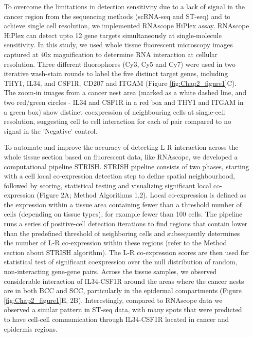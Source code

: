 To overcome the limitations in detection sensitivity due to a lack of signal in the cancer region from the sequencing methods (scRNA-seq and ST-seq) and to achieve single cell resolution, we implemented RNAscope HiPlex assay. RNAscope HiPlex can detect upto 12 gene targets simultaneously at single-molecule sensitivity. In this study, we used whole tissue fluorescent microscopy images captured at 40x magnification to determine RNA interaction at cellular resolution. Three different fluorophores (Cy3, Cy5 and Cy7) were used in two iterative wash-stain rounds to label the five distinct target genes, including THY1, IL34, and CSF1R, CD207 and ITGAM (Figure \ref{fig:Chap2_figure1}C). The zoom-in images from a cancer nest area (marked as a white dashed line, and two red/green circles - IL34 and CSF1R in a red box and THY1 and ITGAM in a green box) show distinct coexpression of neighbouring cells at single-cell resolution, suggesting cell to cell interaction for each of pair compared to no signal in the 'Negative' control. 

To automate and improve the accuracy of detecting L-R interaction across the whole tissue section based on fluorescent data, like RNAscope, we developed a computational pipeline STRISH. STRISH pipeline consists of two phases, starting with a cell local co-expression detection step to define spatial neighbourhood, followed by scoring, statistical testing and visualizing significant local co-expression (Figure 2A; Method Algorithms 1,2). Local co-expression is defined as the expression within a tissue area containing fewer than a threshold number of cells (depending on tissue types), for example fewer than 100 cells. The pipeline runs a series of positive-cell detection iterations to find regions that contain lower than the predefined threshold of neighboring cells and subsequently determines the number of L-R co-expression within these regions (refer to the Method section about STRISH algorithm). The L-R co-expression scores are then used for statistical test of significant coexpression over the null distribution of random, non-interacting gene-gene pairs. Across the tissue samples, we observed considerable interaction of IL34-CSF1R around the areas where the cancer nests are in both BCC and SCC, particularly in the epidermal compartments (Figure \ref{fig:Chap2_figure1}E, 2B). Interestingly, compared to RNAscope data we observed a similar pattern in ST-seq data, with many spots that were predicted to have cell-cell communication through IL34-CSF1R located in cancer and epidermis regions.  


